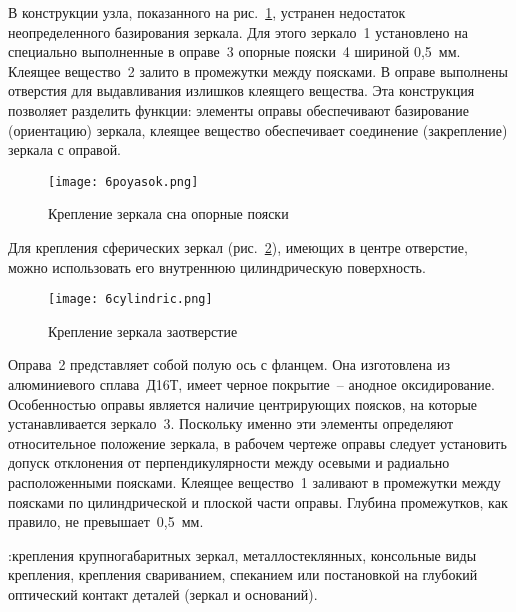 В конструкции узла, показанного на рис.~\ref{pic:6poyasok}, устранен недостаток неопределенного базирования зеркала. Для этого зеркало~1 установлено на специально выполненные в оправе~3 опорные пояски~4 шириной 0,5~мм. Клеящее вещество~2 залито в промежутки между поясками. В оправе выполнены отверстия для выдавливания излишков клеящего вещества. Эта конструкция позволяет разделить функции: элементы оправы обеспечивают базирование (ориентацию) зеркала, клеящее вещество обеспечивает соединение (закрепление) зеркала с оправой.

\begin{figure}
	\begin{center}
		\texttt{[image: 6poyasok.png]}
		\caption[Крепление зеркала с установкой на опорные пояски]{ Крепление зеркала с на опорные пояски }
		\label{pic:6poyasok}
	\end{center}
\end{figure}

Для крепления сферических зеркал (рис.~\ref{pic:6cylindric}), имеющих в центре отверстие, можно использовать его внутреннюю цилиндрическую поверхность.
\begin{figure}[h!]
	\begin{center}
		\texttt{[image: 6cylindric.png]}
		\caption[Крепление зеркала за цилиндрическое отверстие]{ Крепление зеркала за отверстие }
		\label{pic:6cylindric}
	\end{center}
\end{figure}

Оправа~2 представляет собой полую ось с фланцем. Она изготовлена из алюминиевого сплава~Д16Т, имеет черное покрытие~-- анодное оксидирование. Особенностью оправы является наличие центрирующих поясков, на которые устанавливается зеркало~3. 
Поскольку именно эти элементы определяют относительное положение зеркала, в рабочем чертеже оправы следует установить допуск отклонения от перпендикулярности между осевыми и радиально расположенными поясками. Клеящее вещество~1 заливают в промежутки между поясками по цилиндрической и плоской части оправы. Глубина промежутков, как правило, не превышает~0,5~мм.

:крепления крупногабаритных зеркал, металлостеклянных, консольные виды крепления, крепления свариванием, спеканием или постановкой на глубокий оптический контакт деталей (зеркал и оснований). 

